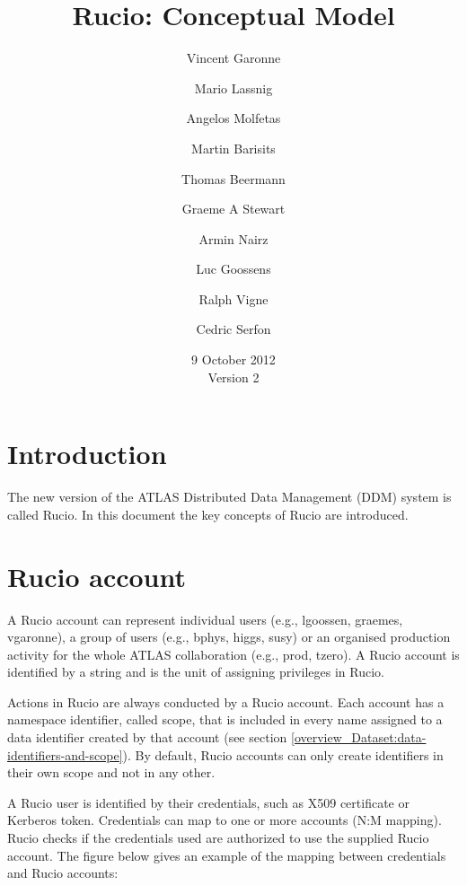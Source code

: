 \documentclass{atlasnote}
\title{Rucio: Conceptual Model}
\author[1]{Vincent Garonne}
\author[1]{Mario Lassnig}
\author[1]{Angelos Molfetas}
\author[1]{Martin Barisits}
\author[1]{Thomas Beermann}
\author[1]{Graeme A Stewart}
\author[1]{Armin Nairz}
\author[1]{Luc Goossens}
\author[1]{Ralph Vigne}
\author[1]{Cedric Serfon}
\affil[1]{PH-ADP-CO, CERN}
\date{9 October 2012\\ Version 2}
\begin{document}
\section{Introduction}

The new version of the ATLAS Distributed Data Management (DDM) system is called Rucio. In this document the key concepts of Rucio are introduced.

\section{Rucio account}
\label{overview_Rucio_account:rucio-account}

A Rucio account can represent individual users (e.g., lgoossen, graemes, vgaronne), a group of users (e.g., bphys, higgs, susy) or an organised production activity for the whole ATLAS collaboration (e.g., prod, tzero). A Rucio account is identified by a string and is the unit of assigning privileges in Rucio.

Actions in Rucio are always conducted by a Rucio account. Each account has a namespace identifier, called scope, that is included in every name assigned to a data identifier created by that account (see section \ref{overview_Dataset:data-identifiers-and-scope}). By default, Rucio accounts can only create identifiers in their own scope and not in any other.

A Rucio user is identified by their credentials, such as X509 certificate or Kerberos token. Credentials can map to one or more accounts (N:M mapping). Rucio checks if the credentials used are authorized to use the supplied Rucio account. The figure below gives an example of the mapping between credentials and Rucio accounts:
\end{document}
